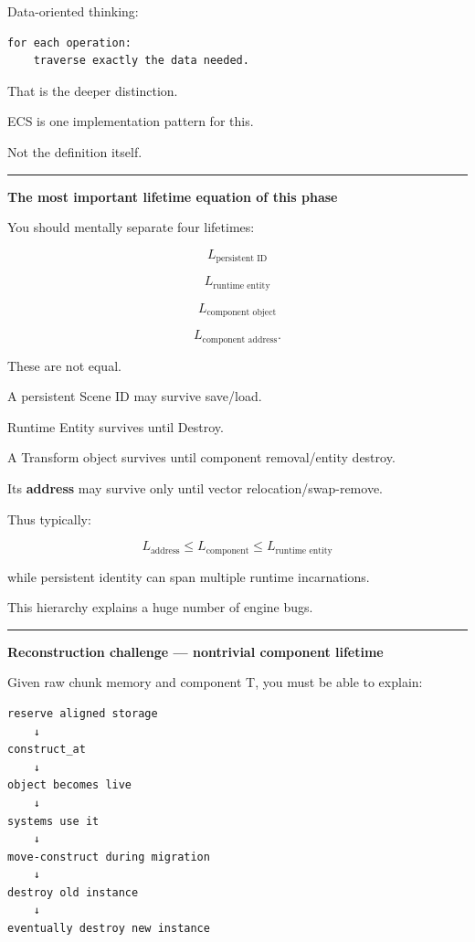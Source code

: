 Data-oriented thinking:

\begin{verbatim}
for each operation:
    traverse exactly the data needed.
\end{verbatim}

That is the deeper distinction.

ECS is one implementation pattern for this.

Not the definition itself.

\begin{center}\rule{0.5\linewidth}{0.5pt}\end{center}

\textbf{The most important lifetime equation of this phase}

You should mentally separate four lifetimes:

\[
L_{\text{persistent ID}}
\]

\[
L_{\text{runtime entity}}
\]

\[
L_{\text{component object}}
\]

\[
L_{\text{component address}}.
\]

These are not equal.

A persistent Scene ID may survive save/load.

Runtime Entity survives until Destroy.

A Transform object survives until component removal/entity destroy.

Its \textbf{address} may survive only until vector relocation/swap-remove.

Thus typically:

\[
L_{\text{address}}
\le
L_{\text{component}}
\le
L_{\text{runtime entity}}
\]

while persistent identity can span multiple runtime incarnations.

This hierarchy explains a huge number of engine bugs.

\begin{center}\rule{0.5\linewidth}{0.5pt}\end{center}

\textbf{Reconstruction challenge --- nontrivial component lifetime}

Given raw chunk memory and component T, you must be able to explain:

\begin{verbatim}
reserve aligned storage
    ↓
construct_at
    ↓
object becomes live
    ↓
systems use it
    ↓
move-construct during migration
    ↓
destroy old instance
    ↓
eventually destroy new instance
\end{verbatim}

